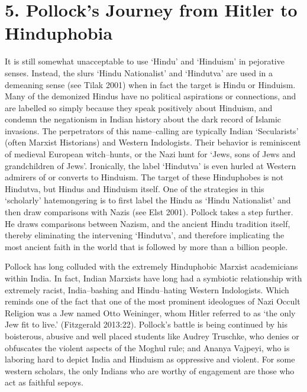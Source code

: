 \section*{5. Pollock’s Journey from Hitler to Hinduphobia}

It is still somewhat unacceptable to use ‘Hindu’ and ‘Hinduism’ in pejorative senses. Instead, the slurs ‘Hindu Nationalist’ and ‘Hindutva’ are used in a demeaning sense (see Tilak 2001) when in fact the target is Hindu or Hinduism. Many of the demonized Hindus have no political aspirations or connections, and are labelled so simply because they speak positively about Hinduism, and condemn the negationism in Indian history about the dark record of Islamic invasions. The perpetrators of this name–calling are typically Indian ‘Secularists’ (often Marxist Historians) and Western Indologists. Their behavior is reminiscent of medieval European witch–hunts, or the Nazi hunt for ‘Jews, sons of Jews and grandchildren of Jews’. Ironically, the label ‘Hindutva’ is even hurled at Western admirers of or converts to Hinduism. The target of these Hinduphobes is not Hindutva, but Hindus and Hinduism itself. One of the strategies in this ‘scholarly’ hatemongering is to first label the Hindu as ‘Hindu Nationalist’ and then draw comparisons with Nazis (see Elst 2001). Pollock takes a step further. He draws comparisons between Nazism, and the ancient Hindu tradition itself, thereby eliminating the intervening ‘Hindutva’, and therefore implicating the most ancient faith in the world that is followed by more than a billion people.

Pollock has long colluded with the extremely Hinduphobic Marxist academicians within India. In fact, Indian Marxists have long had a symbiotic relationship with extremely racist, India–bashing and Hindu–hating Western Indologists. Which reminds one of the fact that one of the most prominent ideologues of Nazi Occult Religion was a Jew named Otto Weininger, whom Hitler referred to as ‘the only Jew fit to live.’ (Fitzgerald 2013:22). Pollock’s battle is being continued by his boisterous, abusive and well placed students like Audrey Truschke, who denies or obfuscates the violent aspects of the Moghul rule; and Ananya Vajpeyi, who is laboring hard to depict India and Hinduism as oppressive and violent. For some western scholars, the only Indians who are worthy of engagement are those who act as faithful sepoys.

